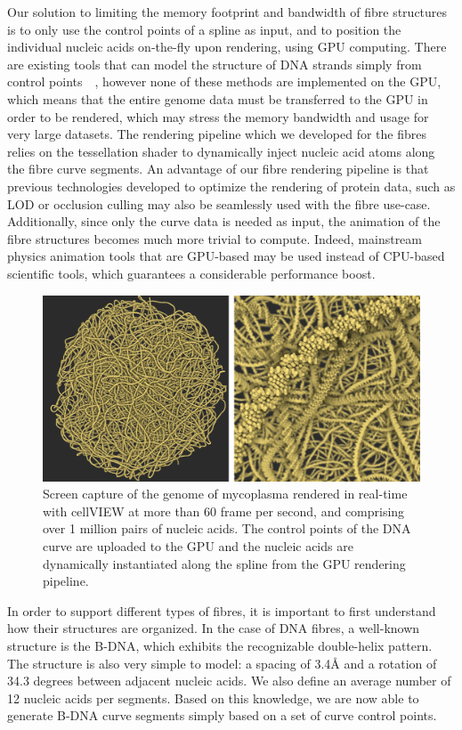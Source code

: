 Our solution to limiting the memory footprint and bandwidth of fibre structures is to only use the control points of a spline as input, and to position the individual nucleic acids on-the-fly upon rendering, using GPU computing.
There are existing tools that can model the structure of DNA strands simply from control points~\cite{lu20083dna}~\cite{hornus2013easy}, however none of these methods are implemented on the GPU, which means that the entire genome data must be transferred to the GPU in order to be rendered, which may stress the memory bandwidth and usage for very large datasets.
The rendering pipeline which we developed for the fibres relies on the tessellation shader to dynamically inject nucleic acid atoms along the fibre curve segments.
An advantage of our fibre rendering pipeline is that previous technologies developed to optimize the rendering of protein data, such as LOD or occlusion culling may also be seamlessly used with the fibre use-case.
Additionally, since only the curve data is needed as input, the animation of the fibre structures becomes much more trivial to compute.
Indeed, mainstream physics animation tools that are GPU-based may be used instead of CPU-based scientific tools, which guarantees a considerable performance boost.
\begin{figure}
	\centering
	\includegraphics[width=0.90\linewidth]{graphics/Picture11}
	\caption{Screen capture of the genome of mycoplasma rendered in real-time with cellVIEW at more than 60 frame per second, and comprising over 1 million pairs of nucleic acids.
		The control points of the DNA curve are uploaded to the GPU and the nucleic acids are dynamically instantiated along the spline from the GPU rendering pipeline. }
	\label{fig:picture11}
\end{figure}
In order to support different types of fibres, it is important to first understand how their structures are organized.
In the case of DNA fibres, a well-known structure is the B-DNA, which exhibits the recognizable double-helix pattern.
The structure is also very simple to model: a spacing of 3.4Å and a rotation of 34.3 degrees between adjacent nucleic acids. 
We also define an average number of 12 nucleic acids per segments.
Based on this knowledge, we are now able to generate B-DNA curve segments simply based on a set of curve control points.

